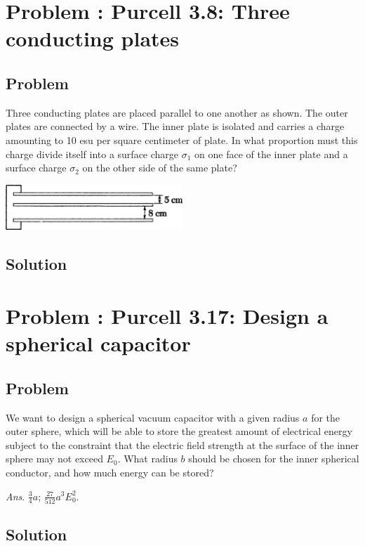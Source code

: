 \documentclass[solutions]{esg8022pset}
\begin{document}
\section{Problem \thesection: Purcell 3.8: Three conducting plates}
\subsection{Problem}
  Three conducting plates are placed parallel to one another as
  shown. The outer plates are connected by a wire. The inner plate
  is isolated and carries a charge amounting to 10 esu per square
  centimeter of plate. In what proportion must this charge divide
  itself into a surface charge $\sigma_1$ on one face of the inner
  plate and a surface charge $\sigma_2$ on the other side of the
  same plate?
  \begin{center}\includegraphics[width=0.5\textwidth]{ps04_04}\end{center}
\subsection{Solution}

\section{Problem \thesection: Purcell 3.17: Design a spherical capacitor}
\subsection{Problem}
  We want to design a spherical vacuum capacitor with a given
  radius $a$ for the outer sphere, which will be able to store the greatest
  amount of electrical energy subject to the constraint that the electric
  field strength at the surface of the inner sphere may not exceed $E_0$.
  What radius $b$ should be chosen for the inner spherical conductor, and
  how much energy can be stored?

  \begin{flushright}\emph{Ans}. $\frac34 a$; $\frac{27}{512} a^3 E_0^2$.\end{flushright}
\subsection{Solution}
\end{document}
